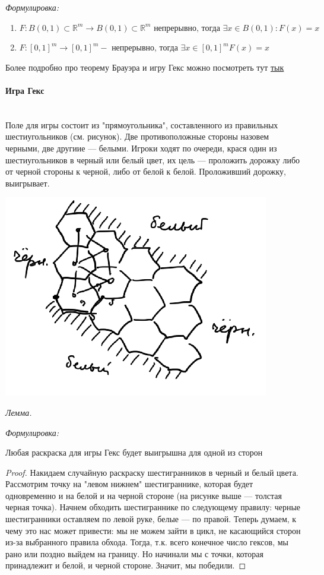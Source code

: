 \documentclass{article}
\let\vanillaparagraph\paragraph
\renewcommand{\paragraph}[1]{\vanillaparagraph{#1}\mbox{}\\}
\begin{document}
\textit{Формулировка:}
\begin{enumerate}
\item $F: B(0, 1) \subset \mathbb{R}^m \rightarrow B(0, 1) \subset \mathbb{R}^m \text{ непрерывно, тогда } \exists x \in B(0, 1): F(x) = x$
\item $F: [0, 1]^m \rightarrow [0, 1]^m - \text{ непрерывно, тогда } \exists x \in [0, 1]^m F(x) = x$
\end{enumerate}

Более подробно про теорему Брауэра и игру Гекс можно посмотреть тут \href{https://arxiv.org/abs/1409.7890}{тык}

\paragraph{Игра Гекс}
Поле для игры состоит из "прямоугольника", составленного из правильных шестиугольников (см. рисунок). Две противоположные стороны назовем черными, две другиие --- белыми. Игроки ходят по очереди, крася один из шестиугольников в черный или белый цвет, их цель --- проложить дорожку либо от черной стороны к черной, либо от белой к белой. Проложивший дорожку, выигрывает.
\begin{center}
    \includegraphics[scale=0.44]{../images/Brauer's_th.png}
\end{center}

\textit{Лемма.}

\textit{Формулировка:}

Любая раскраска для игры Гекс будет выигрышна для одной из сторон

\begin{proof}
Накидаем случайную раскраску шестигранников в черный и белый цвета. Рассмотрим точку на "левом нижнем" шестиграннике, которая будет одновременно и на белой и на черной стороне (на рисунке выше --- толстая черная точка). Начнем обходить шестиграннике по следующему правилу: черные шестигранники оставляем по левой руке, белые --- по правой. Теперь думаем, к чему это нас может привести: мы не можем зайти в цикл, не касающийся сторон из-за выбранного правила обхода. Тогда, т.к. всего конечное число гексов, мы рано или поздно выйдем на границу. Но начинали мы с точки, которая принадлежит и белой, и черной стороне. Значит, мы победили.
\end{proof}
\end{document}
